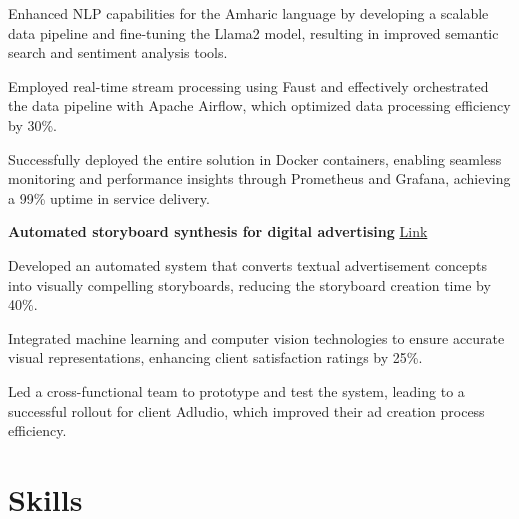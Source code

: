 \documentclass{modern} %
\begin{document}
    \vspace{0.10cm}
    \begin{onecolentry}
        \begin{highlights}
                            \item Enhanced NLP capabilities for the Amharic language by developing a scalable data pipeline and fine{-}tuning the Llama2 model, resulting in improved semantic search and sentiment analysis tools.
                            \item Employed real{-}time stream processing using Faust and effectively orchestrated the data pipeline with Apache Airflow, which optimized data processing efficiency by 30\%.
                            \item Successfully deployed the entire solution in Docker containers, enabling seamless monitoring and performance insights through Prometheus and Grafana, achieving a 99\% uptime in service delivery.
                    \end{highlights}
    \end{onecolentry}
    \begin{onecolentry}
        \textbf{Automated storyboard synthesis for digital advertising}
                    {\href{None}{Link}}

            
            \end{onecolentry}

    \vspace{0.10cm}
    \begin{onecolentry}
        \begin{highlights}
                            \item Developed an automated system that converts textual advertisement concepts into visually compelling storyboards, reducing the storyboard creation time by 40\%.
                            \item Integrated machine learning and computer vision technologies to ensure accurate visual representations, enhancing client satisfaction ratings by 25\%.
                            \item Led a cross{-}functional team to prototype and test the system, leading to a successful rollout for client Adludio, which improved their ad creation process efficiency.
                    \end{highlights}
    \end{onecolentry}

\section{Skills}
\end{document}
